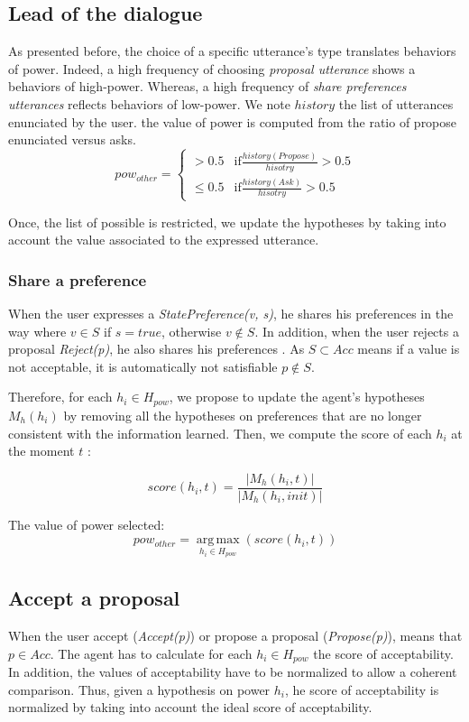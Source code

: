 \documentclass[sigconf]{aamas}  %
\begin{document}
	\subsection{Lead of the dialogue}		
	As presented before, the choice of a specific utterance's type translates behaviors of power. Indeed, a high frequency of choosing \emph{proposal utterance} shows a behaviors of high-power. Whereas, a high frequency of \emph{share preferences utterances} reflects behaviors of low-power.
	We note $history$ the list of utterances enunciated by the user. the value of power is computed from the ratio of propose enunciated versus asks.
	\begin{equation}
	pow_{other} = \left\{\begin{array}{ll}
	> 0.5 & \mathrm{if } \frac{history(Propose)}{hisotry} > 0.5\\
	\leq 0.5 & \mathrm{if  } \frac{history(Ask)}{hisotry} > 0.5
	\end{array}\right.
	\end{equation}
	
	Once, the list of possible is restricted, we update the hypotheses by taking into account the value associated to the expressed utterance.
	
	\subsubsection{Share a preference}
	When the user expresses a \emph{StatePreference(v, s)}, he shares his preferences in the way where $v \in S$ if $s =true$, otherwise $v \notin S$. 
	In addition, when the user rejects a proposal \emph{Reject(p)}, he also shares his preferences . As $S \subset Acc$ means if a value is not acceptable, it is automatically not satisfiable $p \notin S$. 
	
	Therefore, for each  $h_i \in H_{pow}$, we propose to update the agent's hypotheses $M_h(h_i)$ by removing all the hypotheses on preferences that are no longer consistent with the information learned. 
	Then, we compute the score of each $h_i$ at the moment $t$ :
	
	$$score(h_i,t) = \frac{|M_h(h_i, t)|}{|M_h(h_i, init)|}$$
	
	The value of power selected:
	\begin{equation}
	pow_{other} = \operatorname*{arg\,max}_{h_i \in H_{pow}} ( score(h_i,t))
	\end{equation}
	
	\subsection{Accept a proposal}
	When the user accept (\emph{Accept(p)}) or propose a proposal (\emph{Propose(p)}), means that $p \in Acc$. 
	The agent has to calculate for each $h_i \in H_{pow}$ the score of acceptability. In addition, the values of acceptability have to be normalized to allow a coherent comparison. Thus, given a hypothesis on power $h_i$, he score of acceptability is normalized by taking into account the ideal score of acceptability.
	
\end{document}
